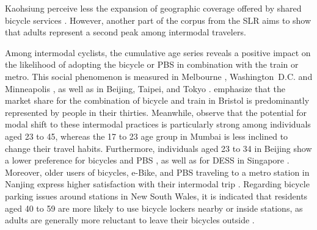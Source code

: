 \begin{refsegment}
Kaohsiung perceive less the expansion of geographic coverage offered by shared bicycle services \textcolor{blue}{\autocite[29]{cheng_expanding_2018}}. However, another part of the corpus from the \acrshort{SLR} aims to show that adults represent a second peak among intermodal travelers.%

Among intermodal cyclists, the cumulative age series reveals a positive impact on the likelihood of adopting the bicycle or \acrshort{PBS} in combination with the train or metro. This social phenomenon is measured in Melbourne \textcolor{blue}{\autocite[403]{weliwitiya_bicycle_2019}}, Washington~D.C. and Minneapolis \textcolor{blue}{\autocite[321]{martin_evaluating_2014}}, as well as in Beijing, Taipei, and Tokyo \textcolor{blue}{\autocites[216]{lin_built_2018}[8]{zhao_public_2022}}. \textcolor{blue}{\textcite[192]{sherwin_practices_2011}} emphasize that the market share for the combination of bicycle and train in Bristol is predominantly represented by people in their thirties. Meanwhile, \textcolor{blue}{\textcite[7]{rastogi_willingness_2010}} observe that the potential for modal shift to these intermodal practices is particularly strong among individuals aged 23 to 45, whereas the 17 to 23 age group in Mumbai is less inclined to change their travel habits. Furthermore, individuals aged 23 to 34 in Beijing show a lower preference for bicycles and \acrshort{PBS} \textcolor{blue}{\autocite[55]{zhao_bicycle-metro_2017}}, as well as for \acrshort{DESS} in Singapore \textcolor{blue}{\autocite[184]{cao_e-scooter_2021}}. Moreover, older users of bicycles, \acrshort{e-Bike}, and \acrshort{PBS} traveling to a metro station in Nanjing express higher satisfaction with their intermodal trip \textcolor{blue}{\autocite[184]{yang_metro_2015}}. Regarding bicycle parking issues around stations in New South Wales, it is indicated that residents aged 40 to 59 are more likely to use bicycle lockers nearby or inside stations, as adults are generally more reluctant to leave their bicycles outside \textcolor{blue}{\autocite[17-18]{arbis_analysis_2016}}.%


\end{refsegment}
